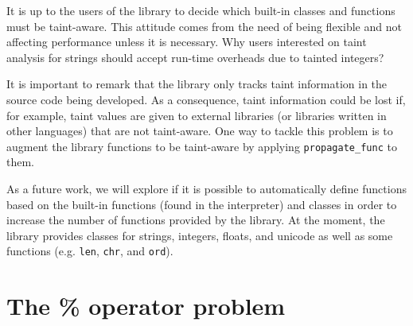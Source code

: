 It is up to the users of the library 
to decide which built-in classes and functions must be
taint-aware. This attitude comes from the need of being flexible 
and not affecting performance unless it is necessary. 
Why users interested on 
taint analysis for strings should accept 
run-time overheads due to tainted integers? 


It is important to remark that the library only tracks taint information 
in the source code being developed. As a consequence, 
taint information could be lost if, for example, 
taint values are given to external 
libraries (or libraries written in other languages)
that are not taint-aware. 
One way to tackle this problem is to augment the library 
functions to be taint-aware by applying \texttt{propagate\_func} to them. 
 

As a future work, we will explore if 
it is possible to automatically 
define \namefunc functions 
based on the built-in functions (found in the 
interpreter) and \nametklass classes in order to 
increase the number of \nametklass functions provided by the library.
At the moment, the library provides 
\nametklass classes for
strings, integers, floats, and unicode as well as some 
\namefunc functions (e.g. \texttt{len}, \texttt{chr}, 
and \texttt{ord}). 

\section{The \% operator problem}
